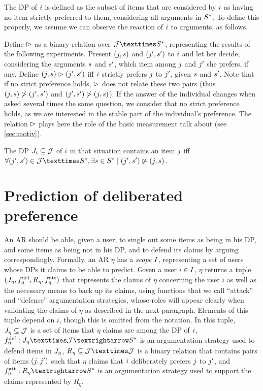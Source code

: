 \documentclass[version=3.21, pagesize, twoside=off, bibliography=totoc, DIV=calc, fontsize=12pt, a4paper, french, english]{scrartcl}
\begin{document}
The \ac{DP} of $i$ is defined as the subset of items that are considered by $i$ as having no item strictly preferred to them, considering all arguments in $S^*$. To define this properly, we assume we can observe the reaction of $i$ to arguments, as follows. 

Define $\vartriangleright$ as a binary relation over $\allitems × \allargs$, representing the results of the following experiments. Present $(j, s)$ and $(j', s')$ to $i$ and let her decide, considering the arguments $s$ and $s'$, which item among $j$ and $j'$ she prefers, if any. 
Define $(j, s) \vartriangleright (j', s')$ iff $i$ strictly prefers $j$ to $j'$, given $s$ and $s'$. Note that if no strict preference holds, $\vartriangleright$ does not relate these two pairs (thus $(j, s) \not\vartriangleright (j', s')$ and $(j', s') \not\vartriangleright (j, s)$). If the answer of the individual changes when asked several times the same question, we consider that no strict preference holds, as we are interested in the stable part of the individual’s preference.
The relation $\vartriangleright$ plays here the role of the basic measurement \citeauthor{von_neumann_theory_1944} talk about (see \cref{sec:motiv}).

The \ac{DP} $J_i \subseteq \mathcal{J}$ of $i$ in that situation contains an item $j$ iff $\forall (\itm', \ar') \in \allitems × \allargs, \exists \ar \in \allargs \suchthat (\itm', \ar') \nibeats (\itm, \ar)$.

\section{Prediction of deliberated preference}
\label{sec:pred}
An \ac{AR} should be able, given a user, to single out some items as being in his \ac{DP}, and some items as being not in his \ac{DP}, and to defend its claims by arguing correspondingly. 
Formally, an \ac{AR} $\eta$ has a \emph{scope} $I$, representing a set of users whose \acp{DP} it claims to be able to predict. Given a user $i \in I$, $\eta$ returns a tuple $(J_{\eta}, f^\text{def}_{\eta}, R_\eta, f^\text{att}_{\eta})$ that represents the claims of $\eta$ concerning the user $i$ as well as the necessary means to back up its claims, using functions that we call “attack” and “defense” argumentation strategies, whose roles will appear clearly when validating the claims of $\eta$ as described in the next paragraph. Elements of this tuple depend on $i$, though this is omitted from the notation. In this tuple, $J_{\eta} \subseteq \mathcal{J}$ is a set of items that $\eta$ claims are among the \ac{DP} of $i$, $\mdef: \mitems × \allitems → \allargs$ is an argumentation strategy used to defend items in $J_{\eta}$, $R_\eta \subseteq \allitems × \allitems$ is a binary relation that contains pairs of items $(j, j')$ such that $\eta$ claims that $i$ deliberately prefers $j$ to $j'$, and $\matt: R_\eta → \allargs$ is an argumentation strategy used to support the claims represented by $R_\eta$. 
\end{document}
